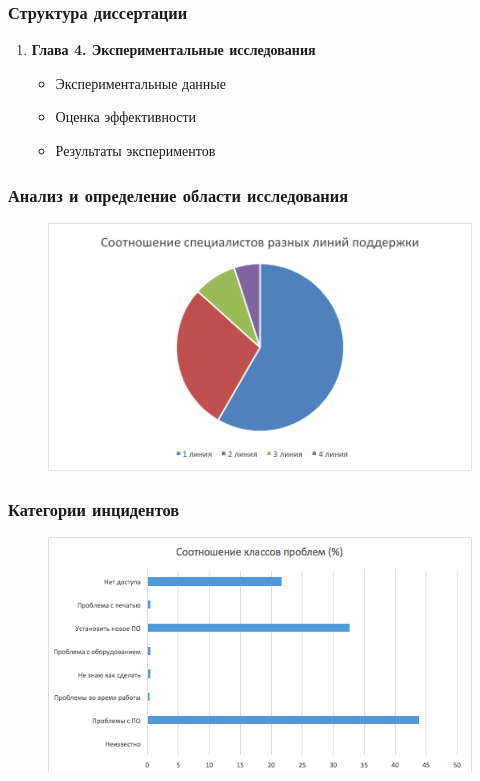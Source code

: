 \documentclass[14pt]{beamer}
\begin{document}
\begin{frame}
\frametitle{Структура диссертации}
\begin{enumerate}
 \item \textbf{Глава 4. Экспериментальные исследования}
  \begin{itemize}
    \item Экспериментальные данные
    \item Оценка эффективности
    \item Результаты экспериментов
  \end{itemize}

\end{enumerate}
\end{frame}

\begin{frame}
\frametitle{Анализ и определение области исследования}
\begin{figure} [h] 
  \center
  \includegraphics [scale=0.7] {ITSMTeamComposition}
  \label{img:ITSMTeamComposition}  
\end{figure}

\end{frame}

\begin{frame}
\frametitle{Категории инцидентов}
\begin{figure} [h] 
  \center
  \includegraphics [scale=0.6] {EngineerTasks}
  \label{img:EngineerTasks}  
\end{figure}
\end{frame}
\end{document}
